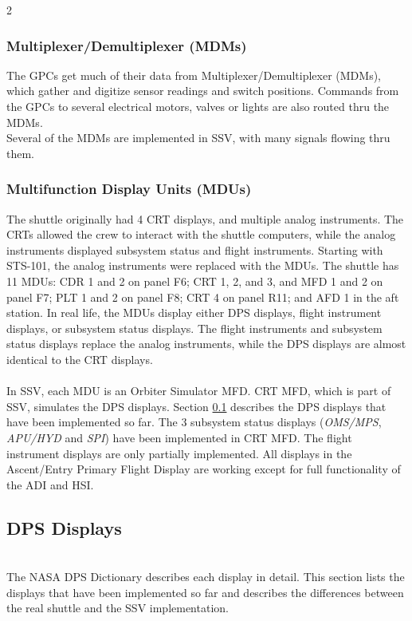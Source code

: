 \documentclass[Space_Shuttle_Vessel_Manual.tex]{subfiles}
\begin{document}
\begin{multicols*}{2}
\subsubsection{Multiplexer/Demultiplexer (MDMs)}
The GPCs get much of their data from Multiplexer/Demultiplexer (MDMs), which gather and digitize sensor readings and switch positions. Commands from the GPCs to several electrical motors, valves or lights are also routed thru the MDMs.\\
Several of the MDMs are implemented in SSV, with many signals flowing thru them.


\subsubsection{Multifunction Display Units (MDUs)}
The shuttle originally had 4 CRT displays, and multiple analog instruments.
The CRTs allowed the crew to interact with the shuttle computers, while the analog instruments displayed subsystem status and flight instruments.
Starting with STS-101, the analog instruments were replaced with the MDUs.
The shuttle has 11 MDUs: CDR 1 and 2 on panel F6; CRT 1, 2, and 3, and MFD 1 and 2 on panel F7; PLT 1 and 2 on panel F8; CRT 4 on panel R11; and AFD 1 in the aft station.
In real life, the MDUs display either DPS displays, flight instrument displays, or subsystem status displays.
The flight instruments and subsystem status displays replace the analog instruments, while the DPS displays are almost identical to the CRT displays.\\
\\
In SSV, each MDU is an Orbiter Simulator MFD. CRT MFD, which is part of SSV, simulates the DPS displays. Section \ref{sec:dps-displays} describes the DPS displays that have been implemented so far.
The 3 subsystem status displays (\textit{OMS/MPS}, \textit{APU/HYD} and \textit{SPI}) have been implemented in CRT MFD.
The flight instrument displays are only partially implemented. All displays in the Ascent/Entry Primary Flight Display are working except for full functionality of the ADI and HSI.
\newpage


\subsection{DPS Displays}
\label{sec:dps-displays}
\noindent
\\
The NASA DPS Dictionary describes each display in detail. This section lists the displays that have been implemented so far and describes the differences between the real shuttle and the SSV implementation.



\end{multicols*}
\end{document}
